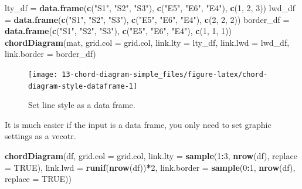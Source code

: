 \documentclass[]{book}
\newenvironment{Shaded}{\begin{snugshade}}{\end{snugshade}}
\newcommand{\KeywordTok}[1]{\textcolor[rgb]{0.13,0.29,0.53}{\textbf{#1}}}
\newcommand{\DataTypeTok}[1]{\textcolor[rgb]{0.13,0.29,0.53}{#1}}
\newcommand{\DecValTok}[1]{\textcolor[rgb]{0.00,0.00,0.81}{#1}}
\newcommand{\StringTok}[1]{\textcolor[rgb]{0.31,0.60,0.02}{#1}}
\newcommand{\OtherTok}[1]{\textcolor[rgb]{0.56,0.35,0.01}{#1}}
\newcommand{\OperatorTok}[1]{\textcolor[rgb]{0.81,0.36,0.00}{\textbf{#1}}}
\newcommand{\NormalTok}[1]{#1}
\theoremstyle{definition}
\theoremstyle{definition}
\theoremstyle{remark}
\begin{document}
\begin{Shaded}
\begin{Highlighting}[]
\NormalTok{lty_df =}\StringTok{ }\KeywordTok{data.frame}\NormalTok{(}\KeywordTok{c}\NormalTok{(}\StringTok{"S1"}\NormalTok{, }\StringTok{"S2"}\NormalTok{, }\StringTok{"S3"}\NormalTok{), }\KeywordTok{c}\NormalTok{(}\StringTok{"E5"}\NormalTok{, }\StringTok{"E6"}\NormalTok{, }\StringTok{"E4"}\NormalTok{), }\KeywordTok{c}\NormalTok{(}\DecValTok{1}\NormalTok{, }\DecValTok{2}\NormalTok{, }\DecValTok{3}\NormalTok{))}
\NormalTok{lwd_df =}\StringTok{ }\KeywordTok{data.frame}\NormalTok{(}\KeywordTok{c}\NormalTok{(}\StringTok{"S1"}\NormalTok{, }\StringTok{"S2"}\NormalTok{, }\StringTok{"S3"}\NormalTok{), }\KeywordTok{c}\NormalTok{(}\StringTok{"E5"}\NormalTok{, }\StringTok{"E6"}\NormalTok{, }\StringTok{"E4"}\NormalTok{), }\KeywordTok{c}\NormalTok{(}\DecValTok{2}\NormalTok{, }\DecValTok{2}\NormalTok{, }\DecValTok{2}\NormalTok{))}
\NormalTok{border_df =}\StringTok{ }\KeywordTok{data.frame}\NormalTok{(}\KeywordTok{c}\NormalTok{(}\StringTok{"S1"}\NormalTok{, }\StringTok{"S2"}\NormalTok{, }\StringTok{"S3"}\NormalTok{), }\KeywordTok{c}\NormalTok{(}\StringTok{"E5"}\NormalTok{, }\StringTok{"E6"}\NormalTok{, }\StringTok{"E4"}\NormalTok{), }\KeywordTok{c}\NormalTok{(}\DecValTok{1}\NormalTok{, }\DecValTok{1}\NormalTok{, }\DecValTok{1}\NormalTok{))}
\KeywordTok{chordDiagram}\NormalTok{(mat, }\DataTypeTok{grid.col =}\NormalTok{ grid.col, }\DataTypeTok{link.lty =}\NormalTok{ lty_df, }\DataTypeTok{link.lwd =}\NormalTok{ lwd_df,}
    \DataTypeTok{link.border =}\NormalTok{ border_df)}
\end{Highlighting}
\end{Shaded}

\begin{figure}

{\centering \texttt{[image: 13-chord-diagram-simple\_files/figure-latex/chord-diagram-style-dataframe-1]} 

}

\caption{Set line style as a data frame.}\label{fig:chord-diagram-style-dataframe}
\end{figure}

It is much easier if the input is a data frame, you only need to set
graphic settings as a vecotr.

\begin{Shaded}
\begin{Highlighting}[]
\KeywordTok{chordDiagram}\NormalTok{(df, }\DataTypeTok{grid.col =}\NormalTok{ grid.col, }\DataTypeTok{link.lty =} \KeywordTok{sample}\NormalTok{(}\DecValTok{1}\OperatorTok{:}\DecValTok{3}\NormalTok{, }\KeywordTok{nrow}\NormalTok{(df), }\DataTypeTok{replace =} \OtherTok{TRUE}\NormalTok{),}
    \DataTypeTok{link.lwd =} \KeywordTok{runif}\NormalTok{(}\KeywordTok{nrow}\NormalTok{(df))}\OperatorTok{*}\DecValTok{2}\NormalTok{, }\DataTypeTok{link.border =} \KeywordTok{sample}\NormalTok{(}\DecValTok{0}\OperatorTok{:}\DecValTok{1}\NormalTok{, }\KeywordTok{nrow}\NormalTok{(df), }\DataTypeTok{replace =} \OtherTok{TRUE}\NormalTok{))}
\end{Highlighting}
\end{Shaded}
\end{document}
